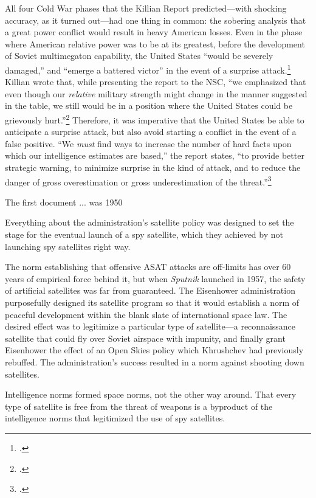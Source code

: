 \documentclass{report}
\begin{document}
All four Cold War phases that the Killian Report predicted---with shocking accuracy, as it turned out---had one thing in common: the sobering analysis that a great power conflict would result in heavy American losses. Even in the phase where American relative power was to be at its greatest, before the development of Soviet multimegaton capability, the United States ``would be severely damaged,'' and ``emerge a battered victor'' in the event of a surprise attack.\footcite{technological_capabilities_panel_meeting_1955} Killian wrote that, while presenting the report to the NSC, ``we emphasized that even though our \emph{relative} military strength might change in the manner suggested in the table, we still would be in a position where the United States could be grievously hurt.''\footcite[p.~75]{killian_sputnik_1977} Therefore, it was imperative that the United States be able to anticipate a surprise attack, but also avoid starting a conflict in the event of a false positive. ``We \emph{must} find ways to increase the number of hard facts upon which our intelligence estimates are based,'' the report states, ``to provide better strategic warning, to minimize surprise in the kind of attack, and to reduce the danger of gross overestimation or gross underestimation of the threat.''\footcite{technological_capabilities_panel_meeting_1955}



The first document ... was 1950

Everything about the administration's satellite policy was designed to set the stage for the eventual launch of a spy satellite, which they achieved by not launching spy satellites right way.

The norm establishing that offensive ASAT attacks are off-limits has over 60 years of empirical force behind it, but when \emph{Sputnik} launched in 1957, the safety of artificial satellites was far from guaranteed. The Eisenhower administration purposefully designed its satellite program so that it would establish a norm of peaceful development within the blank slate of international space law. The desired effect was to legitimize a particular type of satellite---a reconnaissance satellite that could fly over Soviet airspace with impunity, and finally grant Eisenhower the effect of an Open Skies policy which Khrushchev had previously rebuffed. The administration's success resulted in a norm against shooting down satellites.

Intelligence norms formed space norms, not the other way around. That every type of satellite is free from the threat of weapons is a byproduct of the intelligence norms that legitimized the use of spy satellites.
\end{document}
